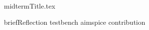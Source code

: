 \documentclass{article}
\begin{document}
{midtermTitle.tex}
\frontmatter
\mainmatter

{briefReflection}
{testbench}
{aimspice}
{contribution}
\end{document}
